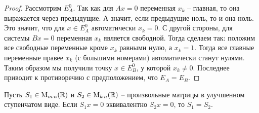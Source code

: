 \begin{proof}
Рассмотрим $E_A^0$.
Так как для $Ax = 0$ переменная $x_k$ -- главная, то она выражается через предыдущие.
А значит, если предыдущие ноль, то и она ноль.
Это значит, что для $x\in E_A^0$ автоматически $x_k = 0$.
С другой стороны, для системы $Bx = 0$ переменная $x_k$ является свободной.
Тогда сделаем так: положим все свободные переменные кроме $x_k$ равными нулю, а $x_k=1$.
Тогда все главные переменные правее $x_k$ (с большими номерами) автоматически станут нулями.
Таким образом мы получили точку $x\in E_B^0$, у которой $x_k\neq 0$.
Последнее приводит к противоречию с предположением, что $E_A = E_B$.
\end{proof}

\begin{claim}
Пусть $S_1\in\operatorname{M}_{m\,n}(\mathbb R)$ и $S_2\in\operatorname{M}_{k\,n}(\mathbb R)$ -- произвольные матрицы в улучшенном ступенчатом виде.
Если $S_1x = 0$ эквивалентно $S_2x=0$, то $S_1 = S_2$.
\end{claim}
